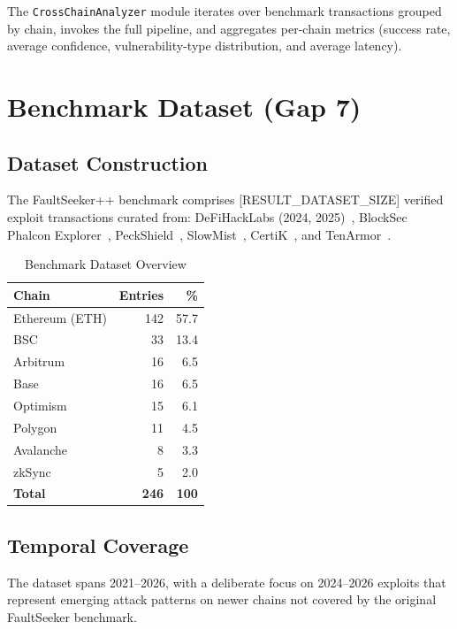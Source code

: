 \documentclass[conference]{IEEEtran}
\begin{document}
The \texttt{CrossChainAnalyzer} module iterates over benchmark
transactions grouped by chain, invokes the full pipeline, and
aggregates per-chain metrics (success rate, average confidence,
vulnerability-type distribution, and average latency).


\section{Benchmark Dataset (Gap 7)}
\label{sec:dataset}

\subsection{Dataset Construction}

The FaultSeeker++ benchmark comprises [RESULT\_DATASET\_SIZE] verified
exploit transactions curated from:
DeFiHackLabs (2024, 2025)~\cite{defihacklabs2024},
BlockSec Phalcon Explorer~\cite{blocksec},
PeckShield~\cite{peckshield},
SlowMist~\cite{slowmist}, CertiK~\cite{certik},
and TenArmor~\cite{tenarmor}.

\begin{table}[h]
\centering
\caption{Benchmark Dataset Overview}
\label{tab:dataset}
\begin{tabular}{lrr}
\toprule
\textbf{Chain} & \textbf{Entries} & \textbf{\%} \\
\midrule
Ethereum (ETH)   & 142 & 57.7 \\
BSC              &  33 & 13.4 \\
Arbitrum         &  16 &  6.5 \\
Base             &  16 &  6.5 \\
Optimism         &  15 &  6.1 \\
Polygon          &  11 &  4.5 \\
Avalanche        &   8 &  3.3 \\
zkSync           &   5 &  2.0 \\
\midrule
\textbf{Total}   & \textbf{246} & \textbf{100} \\
\bottomrule
\end{tabular}
\end{table}

\subsection{Temporal Coverage}

The dataset spans 2021--2026, with a deliberate focus on 2024--2026
exploits that represent emerging attack patterns on newer chains not
covered by the original FaultSeeker benchmark.
\end{document}
